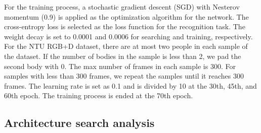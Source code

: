 \documentclass[letterpaper]{article} \usepackage{aaai19}  \usepackage{times}  \usepackage{helvet} \usepackage{courier}  \usepackage[hyphens]{url}  \usepackage{graphicx} \urlstyle{rm} \def\UrlFont{\rm}  \usepackage{graphicx}  \frenchspacing  \setlength{\pdfpagewidth}{8.5in}  \setlength{\pdfpageheight}{11in}
\begin{document}
For the training process, a stochastic gradient descent (SGD) with Nesterov momentum (0.9) is applied as the optimization algorithm for the network. The cross-entropy loss is selected as the loss function for the recognition task. The weight decay is set to 0.0001 and 0.0006 for searching and training, respectively. For the NTU RGB+D dataset, there are at most two people in each sample of the dataset. If the number of bodies in the sample is less than 2, we pad the second body with 0. The max number of frames in each sample is 300. For samples with less than 300 frames, we repeat the samples until it reaches 300 frames. The learning rate is set as 0.1 and is divided by 10 at the 30th, 45th, and 60th epoch. The training process is ended at the 70th epoch.

\subsection{Architecture search analysis} 


\begin{table}[t]\footnotesize
\begin{center}
\vspace{-1em}
\caption{\small{Searched modules at each layer. Here, each row refers to a block layer. There are eight module options, including dynamic graph modules (, , ) with various spatial-temporal cues and Chebshev approximation with different orders ( L, n,,, ). The modules marked with  represent modules selected by CEIM.}}
\vspace{2mm}
\label{tab:architect}
\end{center}
\vspace{-2em}

\end{table}
\end{document}
